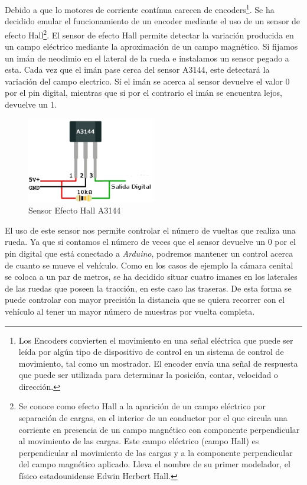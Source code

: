 Debido a que lo motores de corriente contínua carecen de encoders\footnote{Los Encoders convierten el movimiento en una señal eléctrica que puede ser leída por algún tipo de dispositivo de control en un sistema de control de movimiento, tal como un mostrador. El encoder envía una señal de respuesta que puede ser utilizada para determinar la posición, contar, velocidad o dirección.}. Se ha decidido emular el funcionamiento de un encoder mediante el uso de un sensor de efecto Hall\footnote{Se conoce como efecto Hall a la aparición de un campo eléctrico por separación de cargas, en el interior de un conductor por el que circula una corriente en presencia de un campo magnético con componente perpendicular al movimiento de las cargas. Este campo eléctrico (campo Hall) es perpendicular al movimiento de las cargas y a la componente perpendicular del campo magnético aplicado. Lleva el nombre de su primer modelador, el físico estadounidense Edwin Herbert Hall.}. El sensor de efecto Hall permite detectar la variación producida en un campo eléctrico mediante la aproximación de un campo magnético. Si fijamos un imán de neodimio en el lateral de la rueda e instalamos un sensor pegado a esta. Cada vez que el imán pase cerca del sensor A3144, este detectará la variación del campo electrico. Si el imán se acerca al sensor devuelve el valor 0 por el pin digital, mientras que si por el contrario el imán se encuentra lejos, devuelve un 1.

\begin{figure}[hbtp]
 \centering
   \includegraphics[width=0.5\textwidth]{./figures/SensorEH.png}
 \caption{Sensor Efecto Hall A3144}
 \label{fig:sensorEH}
\end{figure}

El uso de este sensor nos permite controlar el número de vueltas que realiza una rueda. Ya que si contamos el número de veces que el sensor devuelve un 0 por el pin digital que está conectado a \emph{Arduino}, podremos mantener un control acerca de cuanto se mueve el vehículo. Como en los casos de ejemplo la cámara cenital se coloca a un par de metros, se ha decidido situar cuatro imanes en los laterales de las ruedas que poseen la tracción, en este caso las traseras. De esta forma se puede controlar con mayor precisión la distancia que se quiera recorrer con el vehículo al tener un mayor número de muestras por vuelta completa.

